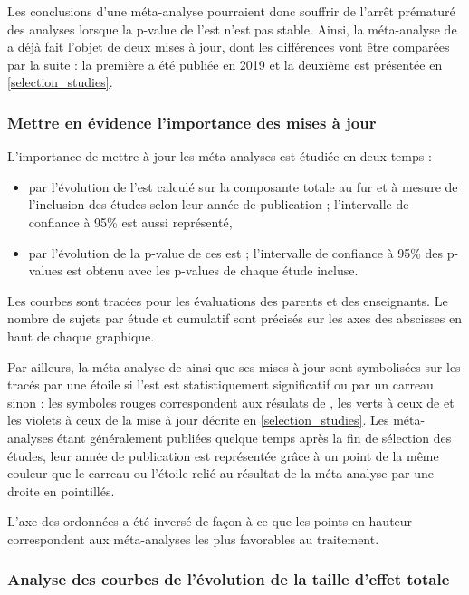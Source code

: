 \begin{itemize}
Les conclusions d'une méta-analyse pourraient donc souffrir de l'arrêt prématuré des analyses lorsque la p-value de l'\gls{est} n'est pas stable. 
Ainsi, la méta-analyse de \citet{Cortese2016} a déjà fait l'objet de deux mises à jour, dont les différences vont être comparées par la suite : la première a été publiée 
en 2019 \citep{Bussalb2019clinical} et la deuxième est présentée en \ref{selection_studies}. 

\subsubsection{Mettre en évidence l'importance des mises à jour}

L'importance de mettre à jour les méta-analyses est étudiée en deux temps :
\begin{itemize}
\item par l'évolution de l'\gls{est} calculé sur la composante totale au fur et à mesure de l'inclusion des études selon leur année de publication ; l'intervalle de confiance à 95\% est 
aussi représenté,
\item par l'évolution de la p-value de ces \gls{est} ; l'intervalle de confiance à 95\% des p-values
est obtenu avec les p-values de chaque étude incluse.
\end{itemize}
Les courbes sont tracées pour les évaluations des parents et des enseignants. Le nombre de sujets par étude et cumulatif sont précisés sur les axes 
des abscisses en haut de chaque graphique.
 
Par ailleurs, la méta-analyse de \citet{Cortese2016} ainsi que ses mises
à jour sont symbolisées sur les tracés par une étoile si l'\gls{est} est statistiquement significatif ou par un carreau sinon : les symboles
rouges correspondent aux résulats de \citet{Cortese2016}, les verts à ceux de \citet{Bussalb2019clinical} et les violets à ceux de la mise à jour décrite en \ref{selection_studies}. Les méta-analyses
étant généralement publiées quelque temps après la fin de sélection des études, leur année de publication est représentée grâce à un point de la même couleur que le carreau ou
l'étoile relié au résultat de la méta-analyse par une droite en pointillés. 

L'axe des ordonnées a été inversé de façon à ce que les points en hauteur correspondent aux méta-analyses les plus favorables au traitement.


\subsubsection{Analyse des courbes de l'évolution de la taille d'effet totale}


\end{itemize}
